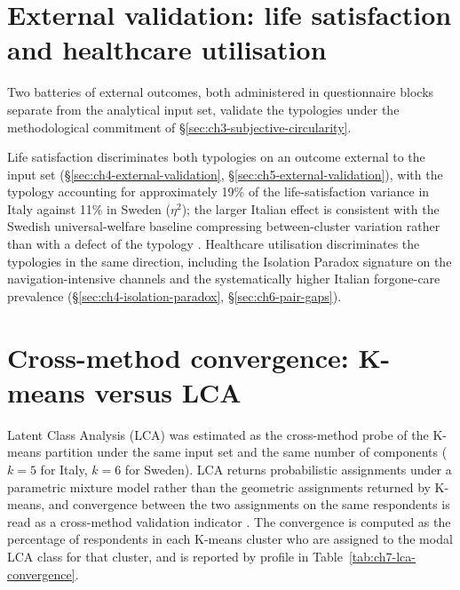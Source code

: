 \section{External validation: life satisfaction and healthcare utilisation}
\label{sec:ch7-external-validation-lifesat}
\label{sec:ch7-external-validation-healthcare}

Two batteries of external outcomes, both administered in questionnaire blocks separate from the analytical input set, validate the typologies under the methodological commitment of \S\ref{sec:ch3-subjective-circularity}.

Life satisfaction discriminates both typologies on an outcome external to the input set (\S\ref{sec:ch4-external-validation}, \S\ref{sec:ch5-external-validation}), with the typology accounting for approximately 19\% of the life-satisfaction variance in Italy against 11\% in Sweden ($\eta^2$); the larger Italian effect is consistent with the Swedish universal-welfare baseline compressing between-cluster variation rather than with a defect of the typology \citep{espingandersen1990}. Healthcare utilisation discriminates the typologies in the same direction, including the Isolation Paradox signature on the navigation-intensive channels and the systematically higher Italian forgone-care prevalence (\S\ref{sec:ch4-isolation-paradox}, \S\ref{sec:ch6-pair-gaps}).
\section{Cross-method convergence: K-means versus LCA}
\label{sec:ch7-cross-method}

Latent Class Analysis (LCA) was estimated as the cross-method probe of the K-means partition under the same input set and the same number of components ($k = 5$ for Italy, $k = 6$ for Sweden). LCA returns probabilistic assignments under a parametric mixture model rather than the geometric assignments returned by K-means, and convergence between the two assignments on the same respondents is read as a cross-method validation indicator \citep{vermuntmagidson2002}. The convergence is computed as the percentage of respondents in each K-means cluster who are assigned to the modal LCA class for that cluster, and is reported by profile in Table~\ref{tab:ch7-lca-convergence}.

